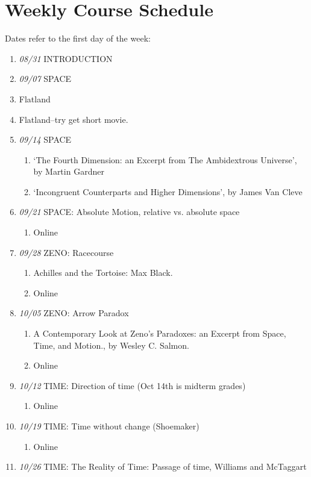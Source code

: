 \documentclass[11pt,article,oneside]{memoir}
\begin{document}
\section{Weekly Course Schedule}
Dates refer to the first day of the week: 
\begin{enumerate}
\item \textit{08/31} INTRODUCTION
\item \textit{09/07} SPACE
\item Flatland
\item Flatland--try get short movie.  
\item \textit{09/14} SPACE
\begin{enumerate}
\item `The Fourth Dimension: an Excerpt from The Ambidextrous Universe', by Martin Gardner
\item `Incongruent Counterparts and Higher Dimensions', by James Van Cleve
\end{enumerate}
\item \textit{09/21} SPACE: Absolute Motion, relative vs. absolute space
\begin{enumerate}
\item Online
\end{enumerate}
\item \textit{09/28} ZENO: Racecourse
\begin{enumerate}
\item Achilles and the Tortoise: Max Black.
\item Online
\end{enumerate}
\item \textit{10/05} ZENO: Arrow Paradox
\begin{enumerate}
\item A Contemporary Look at Zeno’s Paradoxes: an Excerpt from Space, Time, and Motion., by Wesley C. Salmon.
\item Online
\end{enumerate}
\item \textit{10/12} TIME: Direction of time (Oct 14th is midterm grades)
\begin{enumerate}
\item Online
\end{enumerate}
\item \textit{10/19} TIME: Time without change (Shoemaker)
\begin{enumerate}
\item Online
\end{enumerate}
\item  \textit{10/26} TIME: The Reality of Time: Passage of time, Williams and McTaggart

\end{enumerate}
\end{document}
